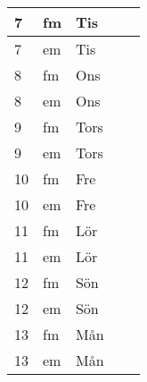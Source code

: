 \documentclass[a4paper]{article}
\begin{document}
\begin{table}[ht!]
\begin{tabular}{lllp{7cm}p{7cm}}
\multicolumn{1}{|l|}{7} & \multicolumn{1}{l|}{fm} & \multicolumn{1}{l|}{Tis} & \multicolumn{1}{l|}{} & \multicolumn{1}{l|}{} \\ \hline
\multicolumn{1}{|l|}{7} & \multicolumn{1}{l|}{em} & \multicolumn{1}{l|}{Tis} & \multicolumn{1}{l|}{} & \multicolumn{1}{l|}{} \\ \hline    

\multicolumn{1}{|l|}{8} & \multicolumn{1}{l|}{fm} & \multicolumn{1}{l|}{Ons} & \multicolumn{1}{l|}{} & \multicolumn{1}{l|}{} \\ \hline
\multicolumn{1}{|l|}{8} & \multicolumn{1}{l|}{em} & \multicolumn{1}{l|}{Ons} & \multicolumn{1}{l|}{} & \multicolumn{1}{l|}{} \\ \hline    

\multicolumn{1}{|l|}{9} & \multicolumn{1}{l|}{fm} & \multicolumn{1}{l|}{Tors} & \multicolumn{1}{l|}{} & \multicolumn{1}{l|}{} \\ \hline
\multicolumn{1}{|l|}{9} & \multicolumn{1}{l|}{em} & \multicolumn{1}{l|}{Tors} & \multicolumn{1}{l|}{} & \multicolumn{1}{l|}{} \\ \hline    

\multicolumn{1}{|l|}{10} & \multicolumn{1}{l|}{fm} & \multicolumn{1}{l|}{Fre} & \multicolumn{1}{l|}{} & \multicolumn{1}{l|}{} \\ \hline
\multicolumn{1}{|l|}{10} & \multicolumn{1}{l|}{em} & \multicolumn{1}{l|}{Fre} & \multicolumn{1}{l|}{} & \multicolumn{1}{l|}{} \\ \hline    

\multicolumn{1}{|l|}{11} & \multicolumn{1}{l|}{fm} & \multicolumn{1}{l|}{Lör} & \multicolumn{1}{l|}{} & \multicolumn{1}{l|}{} \\ \hline
\multicolumn{1}{|l|}{11} & \multicolumn{1}{l|}{em} & \multicolumn{1}{l|}{Lör} & \multicolumn{1}{l|}{} & \multicolumn{1}{l|}{} \\ \hline    

\multicolumn{1}{|l|}{12} & \multicolumn{1}{l|}{fm} & \multicolumn{1}{l|}{Sön} & \multicolumn{1}{l|}{} & \multicolumn{1}{l|}{} \\ \hline
\multicolumn{1}{|l|}{12} & \multicolumn{1}{l|}{em} & \multicolumn{1}{l|}{Sön} & \multicolumn{1}{l|}{} & \multicolumn{1}{l|}{} \\ \hline    

\multicolumn{1}{|l|}{13} & \multicolumn{1}{l|}{fm} & \multicolumn{1}{l|}{Mån} & \multicolumn{1}{l|}{} & \multicolumn{1}{l|}{} \\ \hline
\multicolumn{1}{|l|}{13} & \multicolumn{1}{l|}{em} & \multicolumn{1}{l|}{Mån} & \multicolumn{1}{l|}{} & \multicolumn{1}{l|}{} \\ \hline    


\end{tabular}
\end{table}
\end{document}
